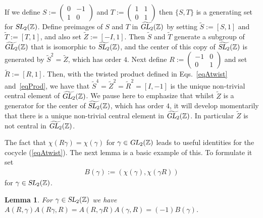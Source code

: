 \documentclass[aps,prd,groupedaddress,preprint,tightenlines,eqsecnum,nofootinbib]{revtex4}
\newcommand{\g}{\gamma}
\newcommand{\SL}{\operatorname{\textsl{SL}}}      %
\newcommand{\GL}{\operatorname{\textsl{GL}}}      %
\newcommand{\Z}{{\mathbb Z}}%
\newcommand{\WT}{\widetilde}
\newtheorem{lem}[thm]{Lemma}
\begin{document}
If we define $S:=\left(\begin{smallmatrix} 0&-1\\1&0\end{smallmatrix}\right)$ and $T:=\left(\begin{smallmatrix} 1&1\\0&1\end{smallmatrix}\right)$ then $\{ S,T\}$ is a generating set for $\SL_2(\Z)$. Define preimages of $S$ and $T$ in $\widetilde{\GL_2}(\Z)$ by setting $\WT S:= [S,1]$ and $\WT T := [T,1]$, and also set $\WT Z:=[-I,1]$. Then $\WT S$ and $\WT T$ generate a subgroup of $\widetilde{\GL_2}(\Z)$ that is isomorphic to $\widetilde{\SL_2}(\Z)$, and the center of this copy of $\widetilde{\SL_2}(\Z)$ is generated by $\WT S^2=\WT Z$, which has order $4$. Next define $R:=\left(\begin{smallmatrix} -1&0\\0&1\end{smallmatrix}\right)$ and set $\WT R:=[R,1]$. Then, with the twisted product defined in Eqs.~\eqref{eqAtwist} and~\eqref{eqProd}, we have that $\WT S^4=\WT Z^2=\WT R^2 =[I,-1]$ is the unique non-trivial central element of $\widetilde{\GL_2}(\Z)$. We pause here to emphasize that whilst $\WT Z$ is a generator for the center of $\widetilde{\SL_2}(\Z)$, which has order $4$, it will develop momentarily that there is a unique non-trivial central element in $\widetilde{\GL_2}(\Z)$. In particular $\WT Z$ is not central in $\widetilde{\GL_2}(\Z)$. 


The fact that $\chi(R\gamma)=\chi(\gamma)$ for $\gamma\in \GL_2(\Z)$ leads to useful identities for the cocycle (\ref{eqAtwist}). The next lemma is a basic example of this. To formulate it set
\begin{align}
\label{eqn:betagamma}
	B(\g):=(\chi(\g),\chi(\g R))
\end{align}
for $\gamma\in \SL_2(\Z)$.
\begin{lem}\label{lem:AAB}
For $\g\in\SL_2(\Z)$ we have $A(R,\gamma)A(R\gamma,R)=A(R,\gamma R)A(\gamma,R) = (-1)B(\gamma)$.
\end{lem}
\end{document}
